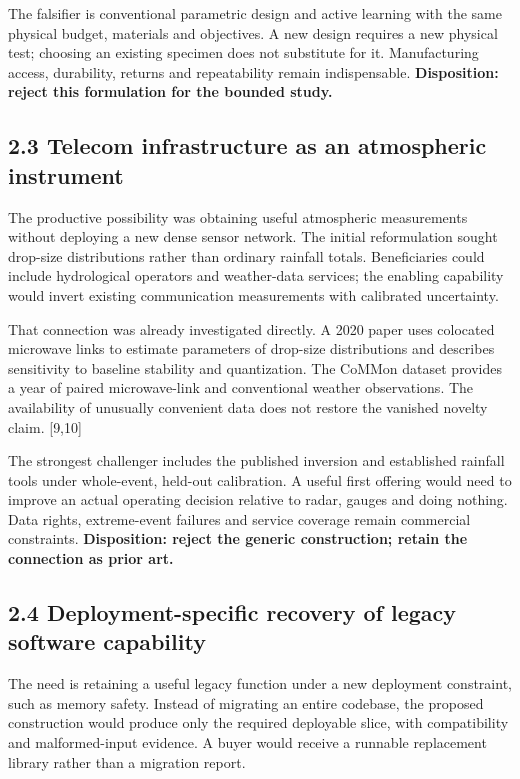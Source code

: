\documentclass[11pt,letterpaper]{article}
\begin{document}
The falsifier is conventional parametric design and active learning with the same physical budget, materials and objectives. A new design requires a new physical test; choosing an existing specimen does not substitute for it. Manufacturing access, durability, returns and repeatability remain indispensable. \textbf{Disposition: reject this formulation for the bounded study.}

\hypertarget{telecom-infrastructure-as-an-atmospheric-instrument}{%
\subsection{2.3 Telecom infrastructure as an atmospheric instrument}\label{telecom-infrastructure-as-an-atmospheric-instrument}}

The productive possibility was obtaining useful atmospheric measurements without deploying a new dense sensor network. The initial reformulation sought drop-size distributions rather than ordinary rainfall totals. Beneficiaries could include hydrological operators and weather-data services; the enabling capability would invert existing communication measurements with calibrated uncertainty.

That connection was already investigated directly. A 2020 paper uses colocated microwave links to estimate parameters of drop-size distributions and describes sensitivity to baseline stability and quantization. The CoMMon dataset provides a year of paired microwave-link and conventional weather observations. The availability of unusually convenient data does not restore the vanished novelty claim. {[}9,10{]}

The strongest challenger includes the published inversion and established rainfall tools under whole-event, held-out calibration. A useful first offering would need to improve an actual operating decision relative to radar, gauges and doing nothing. Data rights, extreme-event failures and service coverage remain commercial constraints. \textbf{Disposition: reject the generic construction; retain the connection as prior art.}

\hypertarget{deployment-specific-recovery-of-legacy-software-capability}{%
\subsection{2.4 Deployment-specific recovery of legacy software capability}\label{deployment-specific-recovery-of-legacy-software-capability}}

The need is retaining a useful legacy function under a new deployment constraint, such as memory safety. Instead of migrating an entire codebase, the proposed construction would produce only the required deployable slice, with compatibility and malformed-input evidence. A buyer would receive a runnable replacement library rather than a migration report.
\end{document}

